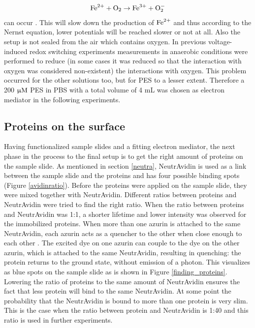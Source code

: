 \documentclass[twoside,single]{lion-msc}
\begin{document}
$$\textup{Fe}^{2+}+\textup{O}_{2}\rightarrow\textup{Fe}^{3+}+\textup{O}_{2}^{-} $$
can occur \cite{Grady1991}. This will slow down the production of $\textup{Fe}^{2+}$ and thus according to the Nernst equation, lower potentials will be reached slower or not at all. Also the setup is not sealed from the air which contains oxygen. In previous voltage-induced redox switching experiments\cite{Akkilic2015} measurements in anaerobic conditions were performed to reduce (in some cases it was reduced so that the interaction with oxygen was considered non-existent) the interactions with oxygen. This problem occurred for the other solutions too, but for PES to a lesser extent. Therefore a 200 $\upmu \textup{M}$ PES in PBS with a total volume of 4 mL was chosen as electron mediator in the following experiments.
 

\subsection{Proteins on the surface}
Having functionalized sample slides and a fitting electron mediator, the next phase in the process to the final setup is to get the right amount of proteins on the sample slide. As mentioned in section \ref{neutra},  NeutrAvidin is used as a link between the sample slide and the proteins and has four possible binding spots  (Figure \ref{avidinratio}). Before the proteins were applied on the sample slide, they were mixed together with NeutrAvidin. Different ratios between proteins and NeutrAvidin were tried to find the right ratio. When the ratio between proteins and NeutrAvidin was 1:1, a shorter lifetime and lower intensity was observed for the immobilized proteins. When more than one azurin is attached to the same NeutrAvidin, each azurin acts as a quencher to the other when close enough to each other \cite{Lakowicz2006}. The excited dye on one azurin can couple to the dye on the other azurin, which is attached to the same NeutrAvidin, resulting in quenching: the protein returns to the ground state, without emission of a photon. This visualizes as blue spots on the sample slide as is shown in Figure \ref{finding_proteins}. Lowering the ratio of proteins to the same amount of NeutrAvidin ensures the fact that less protein will bind to the same NeutrAvidin. At some point the probability that the NeutrAvidin is bound to more than one protein is very slim. This is the case when the ratio between protein and NeutrAvidin is 1:40 and this ratio is used in further experiments.
\end{document}
